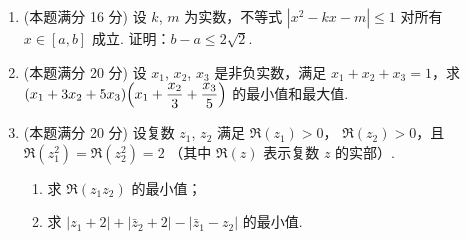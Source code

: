 \documentclass{chsmc}
\begin{document}
\begin{enumerate}[resume]
  \item (本题满分 16 分) 设 $k$, $m$ 为实数，不等式 $|x^2 - kx - m| \leqslant 1$
    对所有 $x \in [a,b]$ 成立. 证明：$b - a \leqslant 2\sqrt{2}$.
  \item (本题满分 20 分) 设 $x_1$, $x_2$, $x_3$ 是非负实数，满足
    $x_1 + x_2 + x_3 = 1$，求
    $(x_1 + 3x_2 + 5x_3)\Bigl(x_1 + \dfrac{x_2}{3} + \dfrac{x_3}{5}\Bigr)$
    的最小值和最大值.
  \item (本题满分 20 分) 设复数 $z_1$, $z_2$ 满足 $\Re(z_1) > 0$，
    $\Re(z_2) > 0$，且 $\Re(z_1^2) = \Re(z_2^2) = 2$
    （其中 $\Re(z)$ 表示复数 $z$ 的实部）.
    \begin{enumerate}[(1)]
      \item 求 $\Re(z_1 z_2)$ 的最小值；
      \item 求 $|z_1 + 2| + |\bar{z}_2 + 2| - |\bar{z}_1 - z_2|$ 的最小值.
    \end{enumerate}
\end{enumerate}
\end{document}
